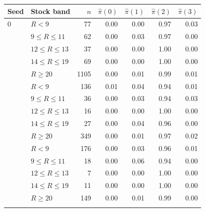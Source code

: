 \begin{tabular}{llrrrrr}
\toprule
Seed & Stock band & $n$ & $\hat\pi(0)$ & $\hat\pi(1)$ & $\hat\pi(2)$ & $\hat\pi(3)$ \\
\midrule
0 & $R<9$ & 77 & 0.00 & 0.00 & 0.97 & 0.03 \\
 & $9\le R\le 11$ & 62 & 0.00 & 0.03 & 0.97 & 0.00 \\
 & $12\le R\le 13$ & 37 & 0.00 & 0.00 & 1.00 & 0.00 \\
 & $14\le R\le 19$ & 69 & 0.00 & 0.00 & 1.00 & 0.00 \\
 & $R\ge 20$ & 1105 & 0.00 & 0.01 & 0.99 & 0.01 \\
\addlinespace
1 & $R<9$ & 136 & 0.01 & 0.04 & 0.94 & 0.01 \\
 & $9\le R\le 11$ & 36 & 0.00 & 0.03 & 0.94 & 0.03 \\
 & $12\le R\le 13$ & 16 & 0.00 & 0.00 & 1.00 & 0.00 \\
 & $14\le R\le 19$ & 27 & 0.00 & 0.04 & 0.96 & 0.00 \\
 & $R\ge 20$ & 349 & 0.00 & 0.01 & 0.97 & 0.02 \\
\addlinespace
2 & $R<9$ & 176 & 0.00 & 0.03 & 0.96 & 0.01 \\
 & $9\le R\le 11$ & 18 & 0.00 & 0.06 & 0.94 & 0.00 \\
 & $12\le R\le 13$ & 7 & 0.00 & 0.00 & 1.00 & 0.00 \\
 & $14\le R\le 19$ & 11 & 0.00 & 0.00 & 1.00 & 0.00 \\
 & $R\ge 20$ & 149 & 0.00 & 0.01 & 0.99 & 0.00 \\
\addlinespace
\bottomrule
\end{tabular}
